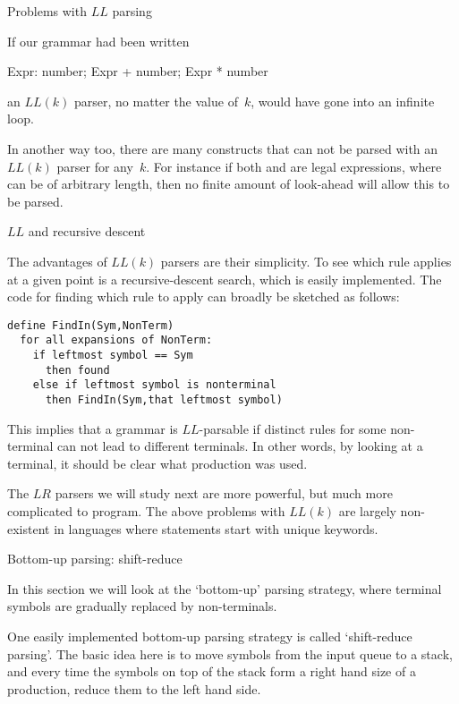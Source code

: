 {Problems with $LL$ parsing}

If our grammar had been written
\begin{bnf}
Expr: number; Expr + number; Expr * number
\end{bnf}
an $LL(k)$ parser, no matter the value of~$k$, would have gone into an
infinite loop.

In another way too, there are many constructs that can not be parsed
with an~$LL(k)$ parser for any~$k$. For instance if both  and
 are legal expressions, where  can be of arbitrary
length, then no finite amount of look-ahead will allow this to be
parsed.

 {$LL$ and recursive descent}

The advantages of $LL(k)$ parsers are their simplicity. To see which
rule applies at a given point is a recursive-descent search, which is
easily implemented. The code for finding which rule to apply can
broadly be sketched as follows:
\begin{verbatim}
define FindIn(Sym,NonTerm)
  for all expansions of NonTerm:
    if leftmost symbol == Sym
      then found
    else if leftmost symbol is nonterminal
      then FindIn(Sym,that leftmost symbol)
\end{verbatim}
This implies that a grammar is $LL$-parsable if distinct rules for
some non-terminal can not lead to different terminals. In other words,
by looking at a terminal, it should be clear what production was used.

The $LR$ parsers we will study next are more
powerful, but much more complicated to program. The above problems
with $LL(k)$ are largely non-existent in languages where statements
start with unique keywords.

 {Bottom-up parsing: shift-reduce}
\label{sec:shift-reduce}

In this section we will look at the `bottom-up' parsing strategy, where terminal symbols are
gradually replaced by non-terminals.

One easily implemented bottom-up parsing strategy is called
`shift-reduce parsing'. The basic idea
here is to move symbols from the input queue to a stack, and every
time the symbols on top of the stack form a right hand size of a
production, reduce them to the left hand side.

